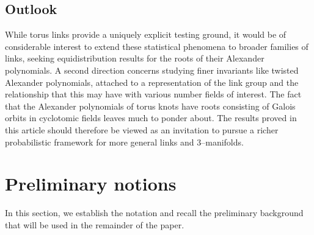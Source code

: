 \documentclass[table]{amsart}
\numberwithin{equation}{section}
\begin{document}
\subsection{Outlook}
\par While torus links provide a uniquely explicit testing ground, it would be of considerable interest to extend these statistical phenomena to broader families of links, seeking equidistribution results for the roots of their Alexander polynomials. A second direction concerns studying finer invariants like twisted Alexander polynomials, attached to a representation of the link group and the relationship that this may have with various number fields of interest. The fact that the Alexander polynomials of torus knots have roots consisting of Galois orbits in cyclotomic fields leaves much to ponder about. The results proved in this article should therefore be viewed as an invitation to pursue a richer probabilistic framework for more general links and $3$–manifolds.


\section{Preliminary notions}

\par In this section, we establish the notation and recall the preliminary background that will be used in the remainder of the paper.
\end{document}
